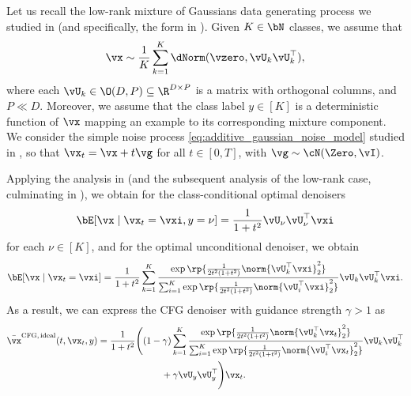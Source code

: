 \documentclass[../../book-main.tex]{subfiles}
\begin{document}
\begin{example}\label{example:denoising-gaussian-mixture-cfg}
    Let us recall the low-rank mixture of Gaussians data generating
    process we studied in
     (and specifically, the form in
    ). Given $K \in \bN$ classes, we assume that
    \begin{equation}\label{eq:MoG1-ch6}
        \vx \sim \frac{1}{K}\sum_{k = 1}^{K}\dNorm(\vzero,
        \vU_{k}\vU_{k}^{\top}),
    \end{equation}
    where each \(\vU_{k} \in \O(D, P) \subseteq \R^{D \times P}\) is
    a matrix with
    orthogonal columns, and $P \ll D$.
    Moreover, we assume that the class label $y \in [K]$ is a deterministic
    function of $\vx$ mapping an example to its corresponding mixture component.
    We consider the simple noise process
    \eqref{eq:additive_gaussian_noise_model} studied in , so
    that $\vx_t = \vx + t \vg$ for all $t \in [0, T]$, with $\vg \sim \cN(\Zero,
    \vI)$.

    Applying the analysis in  (and the
        subsequent analysis of the low-rank case, culminating in
    ), we obtain for the class-conditional optimal
    denoisers
    \begin{equation}\label{eq:gmm_lowrank_denoiser-ch6-classcond}
        \bE[ \vx \mid \vx_t = \vxi, y = \nu ]
        = \frac{1}{1 + t^{2}}
        \vU_{\nu}\vU_{\nu}^{\top}\vxi
    \end{equation}
    for each $\nu \in [K]$, and for the optimal unconditional
    denoiser, we obtain
    \begin{equation}\label{eq:gmm_lowrank_denoiser-ch6-uncond}
        \bE[ \vx \mid \vx_t = \vxi ]
        = \frac{1}{1 + t^{2}}\sum_{k =
        1}^{K}\frac{\exp\rp{\frac{1}{2t^{2}(1 +
        t^{2})}\norm{\vU_{k}^{\top}\vxi}_{2}^{2}}}{\sum_{i =
            1}^{K}\exp\rp{\frac{1}{2t^{2}(1 +
        t^{2})}\norm{\vU_{i}^{\top}\vxi}_{2}^{2}}}\vU_{k}\vU_{k}^{\top}\vxi.
    \end{equation}
    As a result, we can express the CFG denoiser with guidance strength $\gamma
    > 1$ as
    \begin{equation}\label{eq:cfg-denoiser-mog-low-rank}
        \begin{split}
            \bar{\vx}^{\mathrm{CFG,\,ideal}}(t, \vx_t, y)
            =
            \frac{1}{1 + t^{2}}
            \Biggl(
                &(1 - \gamma)
                \sum_{k = 1}^{K}\frac{\exp\rp{\frac{1}{2t^{2}(1
                + t^{2})}\norm{\vU_{k}^{\top}\vx_t}_{2}^{2}}}{\sum_{i
                    = 1}^{K}\exp\rp{\frac{1}{2t^{2}(1
                                +
                t^{2})}\norm{\vU_{i}^{\top}\vx_t}_{2}^{2}}}\vU_{k}\vU_{k}^{\top}
                \\
                &\qquad+
                \gamma
                \vU_{y}\vU_{y}^{\top}
            \Biggr)
            \vx_t.
        \end{split}
    \end{equation}


\end{example}
\end{document}
